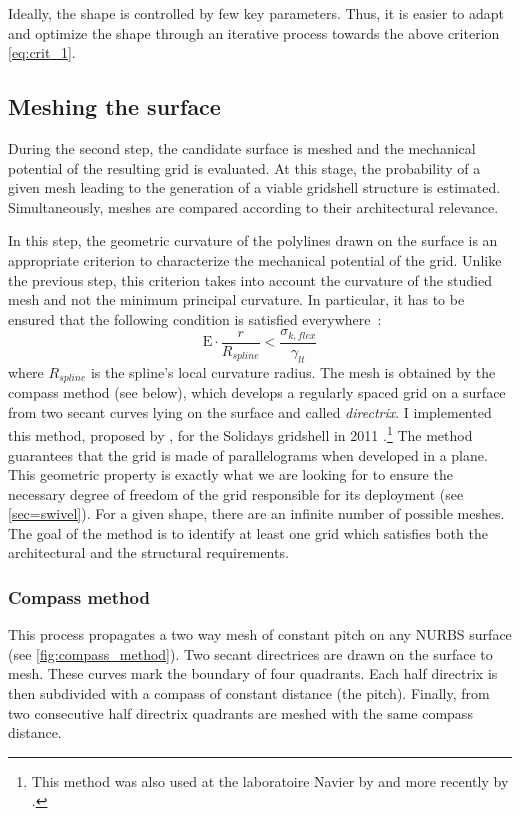 Ideally, the shape is controlled by few key parameters. Thus, it is easier to adapt and optimize the shape through an iterative process towards the above criterion \cref{eq:crit_1}.

\subsection{Meshing the surface}
During the second step, the candidate surface is meshed and the mechanical potential of the resulting grid is evaluated. At this stage, the probability of a given mesh leading to the generation of a viable gridshell structure is estimated. Simultaneously, meshes are compared according to their architectural relevance.

In this step, the geometric curvature of the polylines drawn on the surface is an appropriate criterion to characterize the mechanical potential of the grid. Unlike the previous step, this criterion takes into account the curvature of the studied mesh and not the minimum principal curvature. In particular, it has to be ensured that the following condition is satisfied everywhere~:
\begin{equation}
	\mathrm{E} \cdot   \frac{r}{R_{spline}}  <   \frac{\sigma_{k,flex}}{\gamma_{lt}}
	\label{eq:crit_2}
\end{equation}
where $R_{spline}$ is the spline’s local curvature radius. The mesh is obtained by the compass method (see below), which develops a regularly spaced grid on a surface from two secant curves lying on the surface and called \emph{directrix}. I implemented this method, proposed by \citet{IL10}, for the Solidays gridshell in 2011 \cite{DuPeloux2011}.\footnote{This method was also used at the laboratoire Navier by  and more recently by .} The method guarantees that the grid is made of parallelograms when developed in a plane. This geometric property is exactly what we are looking for to ensure the necessary degree of freedom of the grid responsible for its deployment (see \cref{sec=swivel}). For a given shape, there are an infinite number of possible meshes. The goal of the method is to identify at least one grid which satisfies both the architectural and the structural requirements.

\subsubsection{Compass method}\label{sec=compass}
This process propagates a two way mesh of constant pitch on any NURBS surface (see \cref{fig:compass_method}). Two secant directrices are drawn on the surface to mesh. These curves mark the boundary of four quadrants. Each half directrix is then subdivided with a compass of constant distance (the pitch). Finally, from two consecutive half directrix quadrants are meshed with the same compass distance.

